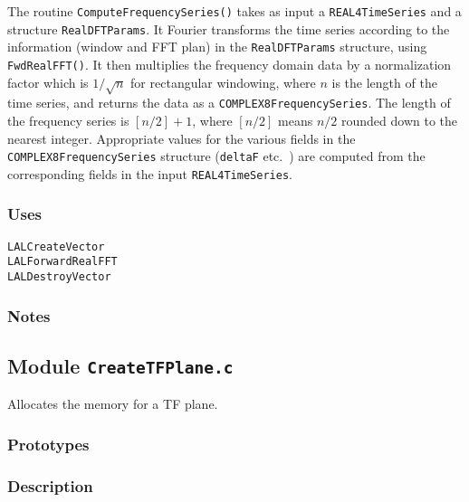 The routine \verb+ComputeFrequencySeries()+ takes as input a
\verb+REAL4TimeSeries+ and a structure \verb+RealDFTParams+.  It Fourier
transforms the time series according to the information (window and FFT plan)
in the \verb+RealDFTParams+ structure, using \verb+FwdRealFFT()+.  It then
multiplies the frequency domain data by a normalization factor which is
$1/\sqrt{n}$ for rectangular windowing, where $n$ is the length of the time
series, and returns the data as a \verb+COMPLEX8FrequencySeries+.  The length
of the frequency series is $[n/2]+1$, where $[n/2]$ means $n/2$ rounded down
to the nearest integer.  Appropriate values for the various fields in the
\verb+COMPLEX8FrequencySeries+ structure (\verb+deltaF+ etc.~) are computed
from the corresponding fields in the input \verb+REAL4TimeSeries+. 

\subsubsection*{Uses}
\begin{verbatim}
LALCreateVector
LALForwardRealFFT
LALDestroyVector
\end{verbatim}

\subsubsection*{Notes}

\vfill{\footnotesize}

\newpage
\subsection{Module \texttt{CreateTFPlane.c}}
\label{ss:CreateTFPlane.c}

Allocates the memory for a TF plane.

\subsubsection*{Prototypes}
\vspace{0.1in}


\subsubsection*{Description}

